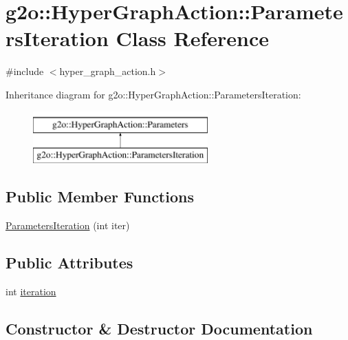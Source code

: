 \hypertarget{classg2o_1_1_hyper_graph_action_1_1_parameters_iteration}{}\section{g2o\+:\+:Hyper\+Graph\+Action\+:\+:Parameters\+Iteration Class Reference}
\label{classg2o_1_1_hyper_graph_action_1_1_parameters_iteration}


{\ttfamily \#include $<$hyper\+\_\+graph\+\_\+action.\+h$>$}

Inheritance diagram for g2o\+:\+:Hyper\+Graph\+Action\+:\+:Parameters\+Iteration\+:\begin{figure}[H]
\begin{center}
\leavevmode
\includegraphics[height=2.000000cm]{classg2o_1_1_hyper_graph_action_1_1_parameters_iteration}
\end{center}
\end{figure}
\subsection*{Public Member Functions}
\begin{DoxyCompactItemize}
\item 
\mbox{\hyperlink{classg2o_1_1_hyper_graph_action_1_1_parameters_iteration_ae6849a5bec7eac20ba0f2b0892212694}{Parameters\+Iteration}} (int iter)
\end{DoxyCompactItemize}
\subsection*{Public Attributes}
\begin{DoxyCompactItemize}
\item 
int \mbox{\hyperlink{classg2o_1_1_hyper_graph_action_1_1_parameters_iteration_a6ec1e8c9333e75e9531bebe055e23ce2}{iteration}}
\end{DoxyCompactItemize}


\subsection{Constructor \& Destructor Documentation}
\mbox{\label{classg2o_1_1_hyper_graph_action_1_1_parameters_iteration_ae6849a5bec7eac20ba0f2b0892212694}} 
